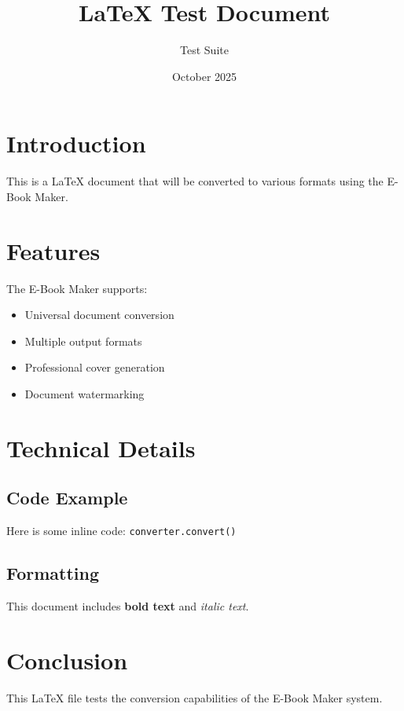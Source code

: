 \documentclass{article}
\title{LaTeX Test Document}
\author{Test Suite}
\date{October 2025}
\begin{document}
\maketitle

\section{Introduction}
This is a LaTeX document that will be converted to various formats using the E-Book Maker.

\section{Features}
The E-Book Maker supports:
\begin{itemize}
    \item Universal document conversion
    \item Multiple output formats
    \item Professional cover generation
    \item Document watermarking
\end{itemize}

\section{Technical Details}
\subsection{Code Example}
Here is some inline code: \texttt{converter.convert()}

\subsection{Formatting}
This document includes \textbf{bold text} and \textit{italic text}.

\section{Conclusion}
This LaTeX file tests the conversion capabilities of the E-Book Maker system.
\end{document}
